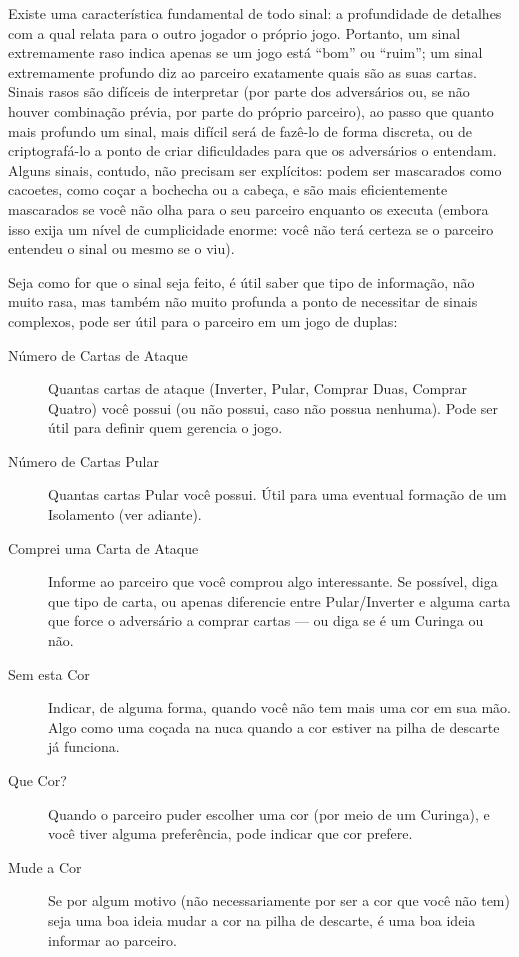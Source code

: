 Existe uma característica fundamental de todo sinal: a profundidade de detalhes com a qual relata para o outro jogador o próprio jogo. Portanto, um sinal extremamente raso indica apenas se um jogo está ``bom'' ou ``ruim''; um sinal extremamente profundo diz ao parceiro exatamente quais são as suas cartas. Sinais rasos são difíceis de interpretar (por parte dos adversários ou, se não houver combinação prévia, por parte do próprio parceiro), ao passo que quanto mais profundo um sinal, mais difícil será de fazê-lo de forma discreta, ou de criptografá-lo a ponto de criar dificuldades para que os adversários o entendam. Alguns sinais, contudo, não precisam ser explícitos: podem ser mascarados como cacoetes, como coçar a bochecha ou a cabeça, e são mais eficientemente mascarados se você não olha para o seu parceiro enquanto os executa (embora isso exija um nível de cumplicidade enorme: você não terá certeza se o parceiro entendeu o sinal ou mesmo se o viu).

Seja como for que o sinal seja feito, é útil saber que tipo de informação, não muito rasa, mas também não muito profunda a ponto de necessitar de sinais complexos, pode ser útil para o parceiro em um jogo de duplas:

\begin{description}
\item[Número de Cartas de Ataque]{Quantas cartas de ataque (Inverter, Pular, Comprar Duas, Comprar Quatro) você possui (ou não possui, caso não possua nenhuma). Pode ser útil para definir quem gerencia o jogo.}
\item[Número de Cartas Pular]{Quantas cartas Pular você possui. Útil para uma eventual formação de um Isolamento (ver adiante).}
\item[Comprei uma Carta de Ataque]{Informe ao parceiro que você comprou algo interessante. Se possível, diga que tipo de carta, ou apenas diferencie entre Pular/Inverter e alguma carta que force o adversário a comprar cartas --- ou diga se é um Curinga ou não.}
\item[Sem esta Cor]{Indicar, de alguma forma, quando você não tem mais uma cor em sua mão. Algo como uma coçada na nuca quando a cor estiver na pilha de descarte já funciona.}
\item[Que Cor?]{Quando o parceiro puder escolher uma cor (por meio de um Curinga), e você tiver alguma preferência, pode indicar que cor prefere.}
\item[Mude a Cor]{Se por algum motivo (não necessariamente por ser a cor que você não tem) seja uma boa ideia mudar a cor na pilha de descarte, é uma boa ideia informar ao parceiro.}
\end{description}

